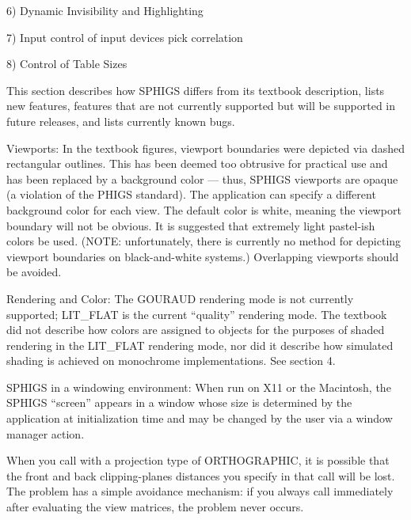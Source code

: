 \newdisplay

\item{6)} Dynamic Invisibility and Highlighting

\newdisplay

\item{7)} Input
 control of input devices
 pick correlation

\newdisplay

\item{8)} Control of Table Sizes


This section describes how SPHIGS differs from its textbook
description, lists new features, features that are not currently
supported but will be supported in future releases, and lists
currently known bugs.

\bullitem Viewports: In the textbook figures, viewport boundaries were
depicted via dashed rectangular outlines.  This has been deemed too
obtrusive for practical use and has been replaced by a background
color --- thus, SPHIGS viewports are opaque (a violation of the PHIGS
standard).  The application can specify a different background color
for each view.  The default color is white, meaning the viewport
boundary will not be obvious.  It is suggested that extremely light
pastel-ish colors be used.  (NOTE: unfortunately, there is currently
no method for depicting viewport boundaries on black-and-white
systems.)  Overlapping viewports should be avoided.

\bullitem Rendering and Color: The GOURAUD rendering mode is not currently
supported; LIT\_FLAT is the current ``quality'' rendering mode.  The
textbook did not describe how colors are assigned to objects for the
purposes of shaded rendering in the LIT\_FLAT rendering mode, nor did
it describe how simulated shading is achieved on monochrome
implementations.  See section 4.

\bullitem SPHIGS in a windowing environment: When run on X11 or the
Macintosh, the SPHIGS ``screen'' appears in a window whose size is
determined by the application at initialization time and may be
changed by the user via a window manager action.

\bullitem {}  When you call 
 with a projection type of
ORTHOGRAPHIC, it is possible that the front and back clipping-planes
distances you specify in that call will be lost.  The problem has a
simple avoidance mechanism: if you always call
 immediately after evaluating the
view matrices, the problem never occurs.

